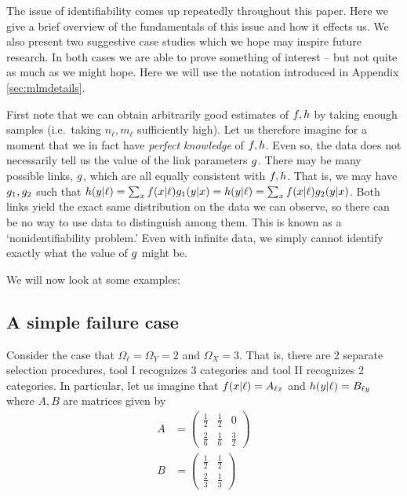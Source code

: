 \label{sec:casestudies}

The issue of identifiability comes up repeatedly throughout this paper.  Here we give a brief overview of the fundamentals of this issue and how it effects us.  We also present two suggestive case studies which we hope may inspire future research.  In both cases we are able to prove something of interest -- but not quite as much as we might hope.  Here we will use the notation introduced in Appendix \ref{sec:mlmdetails}.

First note that we can obtain arbitrarily good estimates of $f,h$ by taking enough samples (i.e.\ taking $n_\ell,m_\ell$ sufficiently high).  Let us therefore imagine for a moment that we in fact have \emph{perfect knowledge} of $f,h$.  Even so, the data does not necessarily tell us the value of the link parameters $g$.  There may be many possible links, $g$, which are all equally consistent with $f,h$.  That is, we may have $g_1,g_2$ such that $h(y|\ell)=\sum_x f(x|\ell)g_1(y|x)=h(y|\ell)=\sum_x f(x|\ell)g_2(y|x)$.  Both links yield the exact same distribution on the data we can observe, so there can be no way to use data to distinguish among them.  This is known as a `nonidentifiability problem.'  Even with infinite data, we simply cannot identify exactly what the value of $g$ might be.

We will now look at some examples:

\subsection{A simple failure case}

Consider the case that $\Omega_\ell = \Omega_Y = 2$ and $\Omega_X=3$.  That is, there are $2$ separate selection procedures, tool I recognizes 3 categories and tool II recognizes 2 categories.  In particular, let us imagine that $f(x|\ell)=A_{\ell x}$ and $h(y|\ell)=B_{\ell y}$ where $A,B$ are matrices given by 
%
\begin{align*}
A&=\left(\begin{array}{ccc}
\frac{1}{2} & \frac{1}{2} & 0\\
\frac{2}{6} & \frac{1}{6} & \frac{3}{2}
\end{array}\right) \\
B&=\left(\begin{array}{cc}
\frac{1}{2} & \frac{1}{2}\\
\frac{2}{3} & \frac{1}{3}
\end{array}\right)
\end{align*}

